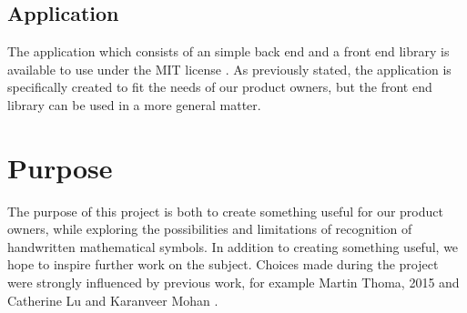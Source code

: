 \subsection{Application}
The application which consists of an simple back end and a front end library is available to use under the MIT license \cite{_mit_????}. As previously stated, the application is specifically created to fit the needs of our product owners, but the front end library can be used in a more general matter. %



\section{Purpose}
The purpose of this project is both to create something useful for our product owners, while exploring the possibilities and limitations of recognition of handwritten mathematical symbols. In addition to creating something useful, we hope to inspire further work on the subject. Choices made during the project were strongly influenced by previous work, for example Martin Thoma, 2015 \cite{thoma_-line_2015} and Catherine Lu and Karanveer Mohan \cite{lu_recognition_2015}.

